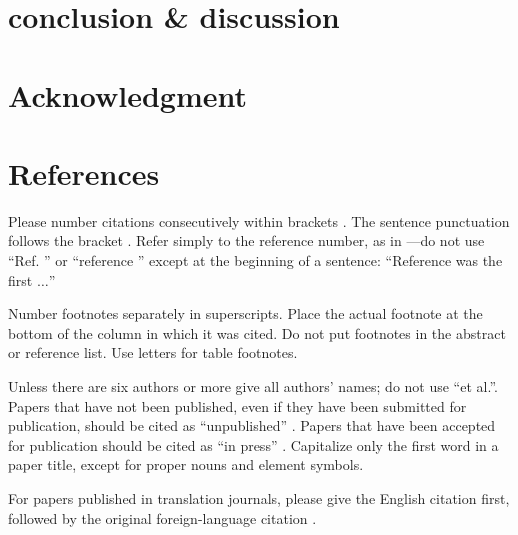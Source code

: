 \documentclass[conference]{IEEEtran}
\begin{document}
\section{conclusion \& discussion}

\section*{Acknowledgment}

\section*{References}

Please number citations consecutively within brackets \cite{b1}. The 
sentence punctuation follows the bracket \cite{b2}. Refer simply to the reference 
number, as in \cite{b3}---do not use ``Ref. \cite{b3}'' or ``reference \cite{b3}'' except at 
the beginning of a sentence: ``Reference \cite{b3} was the first $\ldots$''

Number footnotes separately in superscripts. Place the actual footnote at 
the bottom of the column in which it was cited. Do not put footnotes in the 
abstract or reference list. Use letters for table footnotes.

Unless there are six authors or more give all authors' names; do not use 
``et al.''. Papers that have not been published, even if they have been 
submitted for publication, should be cited as ``unpublished'' \cite{b4}. Papers 
that have been accepted for publication should be cited as ``in press'' \cite{b5}. 
Capitalize only the first word in a paper title, except for proper nouns and 
element symbols.

For papers published in translation journals, please give the English 
citation first, followed by the original foreign-language citation \cite{b6}.
\end{document}
